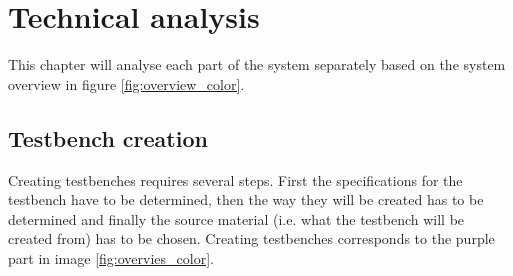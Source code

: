 

\chapter{Technical analysis} \label{TA}
This chapter will analyse each part of the system separately based on the system overview in figure \ref{fig:overview_color}.
\section{Testbench creation}
Creating testbenches requires several steps. First the specifications for the testbench have to be determined, then the way they will be created has to be determined and finally the source material (i.e. what the testbench will be created from) has to be chosen. Creating testbenches corresponds to the purple part in image \ref{fig:overvies_color}.
